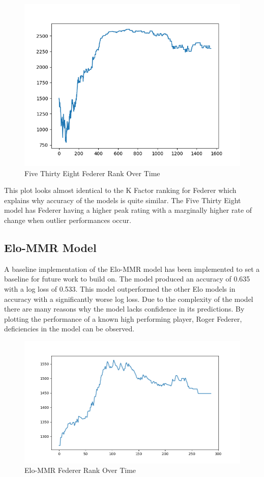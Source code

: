 \documentclass[12pt,a4paper]{article}
\begin{document}
\begin{figure}[H]
  \centering
  \includegraphics[scale=0.8]{images/federer_538.png}
  \caption{Five Thirty Eight Federer Rank Over Time}
  \label{fig:federer-538}
\end{figure}

This plot looks almost identical to the K Factor ranking for Federer which explains why
accuracy of the models is quite similar. The Five Thirty Eight model has Federer having a
higher peak rating with a marginally higher rate of change when outlier performances occur.

\subsection{Elo-MMR Model}
A baseline implementation of the Elo-MMR model has been implemented to set a baseline for
future work to build on. The model produced an accuracy of 0.635 with a log loss of 0.533.
This model outperformed the other Elo models in accuracy with a significantly worse log loss.
Due to the complexity of the model there are many reasons why the model lacks confidence
in its predictions. By plotting the performance of a known high performing player, Roger Federer,
deficiencies in the model can be observed.

\begin{figure}[H]
  \includegraphics[scale=0.6]{images/federer.png}
  \caption{Elo-MMR Federer Rank Over Time}
  \label{fig:federer-elo-mmr}
\end{figure}
\end{document}

